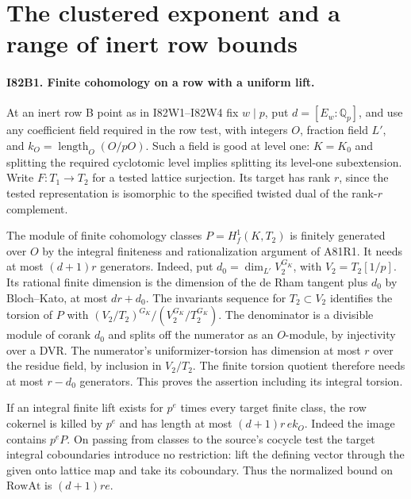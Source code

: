 \section{The clustered exponent and a range of inert row bounds}

\paragraph{I82B1. Finite cohomology on a row with a uniform lift.}
At an inert row B point as in I82W1--I82W4 fix $w\mid p$, put
$d=[E_w:\mathbb Q_p]$, and use any coefficient field required in
the row test, with integers $O$, fraction field $L'$, and
$k_O=\operatorname{length}_O(O/pO)$. Such a field is good at
level one: $K=K_0$ and splitting the required cyclotomic level
implies splitting its level-one subextension. Write $F:T_1\to T_2$
for a tested lattice surjection. Its target has rank $r$, since
the tested representation is isomorphic to the specified twisted
dual of the rank-$r$ complement.

The module of finite cohomology classes $P=H^1_f(K,T_2)$ is
finitely generated over $O$ by the integral finiteness and
rationalization argument of A81R1. It needs at most $(d+1)r$
generators. Indeed, put $d_0=\dim_{L'} V_2^{G_K}$, with
$V_2=T_2[1/p]$. Its rational finite dimension is the dimension of
the de Rham tangent plus $d_0$ by Bloch--Kato, at most $dr+d_0$.
The invariants sequence for $T_2\subset V_2$ identifies the
torsion of $P$ with $(V_2/T_2)^{G_K}/(V_2^{G_K}/T_2^{G_K})$.
The denominator is a divisible module of corank $d_0$ and
splits off the numerator as an $O$-module, by injectivity over a
DVR. The numerator's uniformizer-torsion has dimension at most $r$
over the residue field, by inclusion in $V_2/T_2$. The finite
torsion quotient therefore needs at most $r-d_0$ generators.
This proves the assertion including its integral torsion.

If an integral finite lift exists for $p^e$ times every target
finite class, the row cokernel is killed by $p^e$ and has length
at most $(d+1)r\, e k_O$. Indeed the image contains $p^e P$.
On passing from classes to the source's cocycle test the target
integral coboundaries introduce no restriction: lift the defining
vector through the given onto lattice map and take its coboundary.
Thus the normalized bound on $\mathrm{RowAt}$ is $(d+1)r e$.

